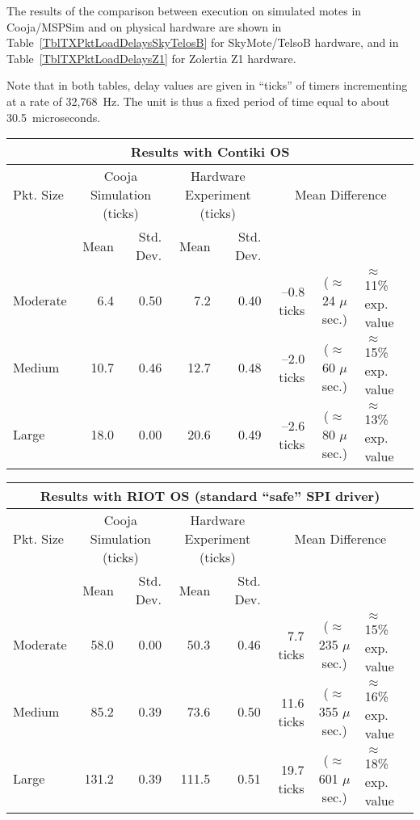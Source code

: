 \documentclass[10pt]{ewsn-proc}
\begin{document}
\medskip

The results of the comparison between execution on simulated motes
in Cooja/MSPSim and on physical hardware are shown in
Table~\ref{TblTXPktLoadDelaysSkyTelosB} for SkyMote/TelsoB hardware,
and in Table~\ref{TblTXPktLoadDelaysZ1} for Zolertia Z1 hardware.

Note that in both tables, delay values are given in ``ticks'' of timers
incrementing at a rate of 32,768~Hz. The unit is thus a fixed period of
time equal to about 30.5~microseconds.


\newcommand{\tabtitle}[1]{\multicolumn{8}{c}{\bfseries #1}}
\newcommand{\ticks}[1]{#1 ticks}
\newcommand{\moy}[1]{#1}
\newcommand{\ect}[1]{#1}
\newcommand{\estus}[1]{($\approx$ #1 $\mu$sec.)}
\newcommand{\prctv}[1]{$\approx$ #1\% exp. value}


\begin{table*}[htb]
\caption{Delays Observed for Loading One Packet into CC2420 TX Buffer
of a SkyMote/TelosB Mote, Using Various Software Setups.}
\label{TblTXPktLoadDelaysSkyTelosB}
\centering

\begin{tabular}{l|rr|rr|rcl}
\tabtitle{Results with Contiki OS}\\
\hline
Pkt. Size & \multicolumn{2}{c|}{Cooja Simulation (ticks)}
          & \multicolumn{2}{c|}{Hardware Experiment (ticks)}
          & \multicolumn{3}{c}{Mean Difference} \\
\hline
          & Mean & Std. Dev. & Mean & Std. Dev. & \\
\hline
 Moderate & \moy{6.4} & \ect{0.50} & \moy{7.2} & \ect{0.40}
          & \ticks{--0.8}  & \estus{24} & \prctv{11} \\
 Medium   & \moy{10.7} & \ect{0.46} & \moy{12.7} & \ect{0.48}
          & \ticks{--2.0}  & \estus{60} & \prctv{15} \\
 Large    & \moy{18.0} & \ect{0.00} & \moy{20.6} & \ect{0.49}
          & \ticks{--2.6}  & \estus{80} & \prctv{13} \\
\hline
\end{tabular}

\vspace{4pt}

\begin{tabular}{l|rr|rr|rcl}
\tabtitle{Results with RIOT OS (standard ``safe'' SPI driver)}\\
\hline
Pkt. Size & \multicolumn{2}{c|}{Cooja Simulation (ticks)}
          & \multicolumn{2}{c|}{Hardware Experiment (ticks)}
          & \multicolumn{3}{c}{Mean Difference} \\
\hline
          & Mean & Std. Dev. & Mean & Std. Dev. & \\
\hline
 Moderate & \moy{58.0} & \ect{0.00} & \moy{50.3} & \ect{0.46}
          & \ticks{7.7}  & \estus{235} & \prctv{15} \\
 Medium   & \moy{85.2} & \ect{0.39} & \moy{73.6} & \ect{0.50}
          & \ticks{11.6}  & \estus{355} & \prctv{16} \\
 Large    & \moy{131.2} & \ect{0.39} & \moy{111.5} & \ect{0.51}
          & \ticks{19.7}  & \estus{601} & \prctv{18} \\
\hline
\end{tabular}


\end{table*}
\end{document}
